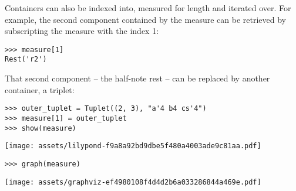 \noindent Containers can also be indexed into, measured for length and iterated
over. For example, the second component contained by the measure can be
retrieved by subscripting the measure with the index 1:

\begin{comment}
<abjad>
measure[1]
</abjad>
\end{comment}

\begin{abjadbookoutput}
\begin{singlespacing}
\vspace{-0.5\baselineskip}
\begin{lstlisting}
>>> measure[1]
Rest('r2')
\end{lstlisting}
\end{singlespacing}
\end{abjadbookoutput}

\noindent That second component -- the half-note rest -- can be replaced by
another container, a triplet:

\begin{comment}
<abjad>
outer_tuplet = Tuplet((2, 3), "a'4 b4 cs'4")
measure[1] = outer_tuplet
show(measure)
</abjad>
\end{comment}

\begin{abjadbookoutput}
\begin{singlespacing}
\vspace{-0.5\baselineskip}
\begin{lstlisting}
>>> outer_tuplet = Tuplet((2, 3), "a'4 b4 cs'4")
>>> measure[1] = outer_tuplet
>>> show(measure)
\end{lstlisting}
\noindent\texttt{[image: assets/lilypond-f9a8a92bd9dbe5f480a4003ade9c81aa.pdf]}
\end{singlespacing}
\end{abjadbookoutput}

\begin{comment}
<abjad>
graph(measure)
</abjad>
\end{comment}

\begin{abjadbookoutput}
\begin{singlespacing}
\vspace{-0.5\baselineskip}
\begin{lstlisting}
>>> graph(measure)
\end{lstlisting}
\noindent\texttt{[image: assets/graphviz-ef4980108f4d4d2b6a033286844a469e.pdf]}
\end{singlespacing}
\end{abjadbookoutput}

